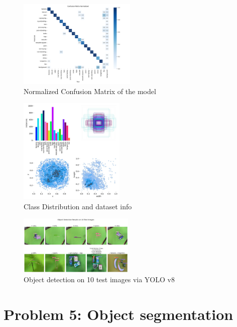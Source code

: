 \documentclass[conference]{IEEEtran}
\begin{document}
\begin{figure}[htbp]
  \centering
  \includegraphics[width=0.5\textwidth]{figures/confusion_matrix_normalized.png}
  \caption{Normalized Confusion Matrix of the model}
  \label{fig:prob4-c}
\end{figure}

\begin{figure}[htbp]
  \centering
  \includegraphics[width=0.45\textwidth]{figures/labels.jpg}
  \caption{Class Distribution and dataset info}
  \label{fig:prob4-d}
\end{figure}

\begin{figure}[htbp]
  \centering
  \includegraphics[width=0.49\textwidth]{figures/prob4.png}
  \caption{Object detection on 10 test images via YOLO v8}
  \label{fig:prob4-e}
\end{figure}
\vspace{10px}

\section{Problem 5: Object segmentation}
\end{document}
